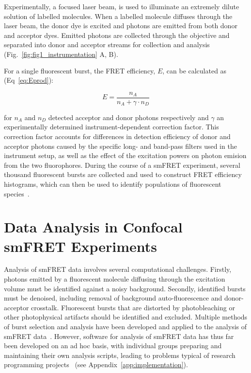 Experimentally, a focused laser beam, is used to illuminate an extremely dilute solution of labelled molecules. When a labelled molecule diffuses through the laser beam, the donor dye is excited and photons are emitted from both donor and acceptor dyes.  Emitted photons are collected through the objective and separated into donor and acceptor streams for collection and analysis (Fig.~\ref{fig:fig1_instrumentation} A, B). 

For a single fluorescent burst, the FRET efficiency, $E$, can be calculated as (Eq~\ref{eq:Eprod}):

\begin{equation}
E = \frac{n_A}{n_A + \gamma \cdot n_D}
\label{eq:Eprod}
\end{equation} 

for $n_A$ and $n_D$ detected acceptor and donor photons respectively and $\gamma$ an experimentally determined instrument-dependent correction factor. This correction factor accounts for differences in detection efficiency of donor and acceptor photons caused by the specific long- and band-pass filters used in the instrument setup, as well as the effect of the excitation powers on photon emision from the two fluorophores. During the course of a smFRET experiment, several thousand fluorescent bursts are collected and used to construct FRET efficiency histograms, which can then be used to identify populations of fluorescent species~\cite{ha96}.

\section{Data Analysis in Confocal smFRET Experiments}
Analysis of smFRET data involves several computational challenges. Firstly, photons emitted by a fluorescent molecule diffusing through the excitation volume must be identified against a noisy background. Secondly, identified bursts must be denoised, including removal of background auto-fluorescence and donor-acceptor crosstalk. Fluorescent bursts that are distorted by photobleaching or other photophysical artifacts should be identified and excluded. Multiple methods of burst selection and analysis have been developed and applied to the analysis of smFRET data~\cite{weiss00, deniz01, gell06, nir06, kapanidis05, muller05, doose07, kudryavtsev2012, eggeling01}. However, software for analysis of smFRET data has thus far been developed on an ad hoc basis, with individual groups preparing and maintaining their own analysis scripts, leading to problems typical of research programming projects~\cite{wilson06, merali10} (see Appendix~\ref{app:implementation}).


